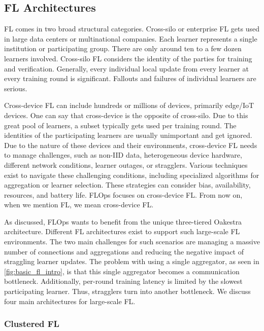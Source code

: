\subsection{FL Architectures}

FL comes in two broad structural categories.
Cross-silo or enterprise FL gets used in large data centers or multinational companies.
Each learner represents a single institution or participating group.
There are only around ten to a few dozen learners involved.
Cross-silo FL considers the identity of the parties for training and verification.
Generally, every individual local update from every learner at every training round is significant.
Fallouts and failures of individual learners are serious.

Cross-device FL can include hundreds or millions of devices, primarily edge/IoT devices.
One can say that cross-device is the opposite of cross-silo.
Due to this great pool of learners, a subset typically gets used per training round.
The identities of the participating learners are usually unimportant and get ignored.
Due to the nature of these devices and their environments, cross-device FL needs to manage challenges, such as non-IID data, heterogeneous device hardware,
different network conditions, learner outages, or stragglers.
Various techniques exist to navigate these challenging conditions, including specialized algorithms for aggregation or learner selection.
These strategies can consider bias, availability, resources, and battery life.
FLOps focuses on cross-device FL.
From now on, when we mention FL, we mean cross-device FL.

As discussed, FLOps wants to benefit from the unique three-tiered Oakestra \cite{paper:oakestra_usenix} architecture.
Different FL architectures exist to support such large-scale FL environments.
The two main challenges for such scenarios are managing a massive number of connections and aggregations
and reducing the negative impact of straggling learner updates.
The problem with using a single aggregator, as seen in \ref{fig:basic_fl_intro}, is that this single aggregator becomes a communication bottleneck.
Additionally, per-round training latency is limited by the slowest participating learner.
Thus, stragglers turn into another bottleneck.
We discuss four main architectures for large-scale FL.

\subsubsection{Clustered FL}

